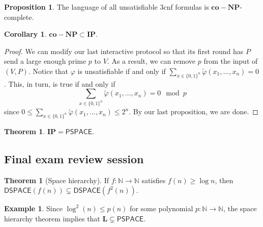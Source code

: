 \documentclass[10pt,letterpaper,cm]{nupset}
\theoremstyle{definition}
\newtheorem{exmp}[definition]{Example}
\theoremstyle{theorem}
\newtheorem{theorem}[definition]{Theorem}
\newtheorem{prop}[definition]{Proposition}
\newtheorem{corollary}[definition]{Corollary}
\theoremstyle{remark}
\newcommand{\N}{\mathbb N}
\newcommand{\1}{\mathbf{1}}
\newcommand{\0}{\vec 0}
\begin{document}
\begin{prop}
The language of all unsatisfiable 3cnf formulas is $\mathbf{co{-}NP}$-complete.
\end{prop}

\begin{corollary}
$\mathbf{co{-}NP} \subset \mathbf{IP}$.
\end{corollary}
\begin{proof}
We can modify our last interactive protocol so that its first round has $P$ send a large enough prime $p$ to $V$. As a result, we can remove $p$ from the input of $(V, P)$. Notice that $\varphi$ is unsatisfiable if and only if $\sum_{x\in \{0,1\}^n} \tilde{\varphi}(x_1, \ldots, x_n) =0$. This, in turn, is true if and only if  $$ \sum_{x\in \{0,1\}^n} \tilde{\varphi}(x_1, \ldots, x_n) =0 \mod p$$ since  $0\leq \sum_{x\in \{0,1\}^n} \tilde{\varphi}(x_1, \ldots, x_n) \leq 2^n$. By our last proposition, we are done. 
\end{proof}

\begin{theorem}
$\mathbf{IP} = \mathsf{PSPACE}$.
\end{theorem}

\subsection{Final exam review session}

\begin{theorem}[Space hierarchy]
If $f: \N \to \N$ satisfies $f(n) \geq \log{n}$, then $\mathsf{DSPACE}(f(n)) \subsetneq \mathsf{DSPACE}(f^2(n))$.
\end{theorem}

\begin{exmp}
 Since $\log^2(n) \leq p(n)$ for some polynomial $p: \N \to \N$, the space hierarchy theorem implies that $\mathbf{L} \subsetneq \mathsf{PSPACE}$.
\end{exmp}
\end{document}

